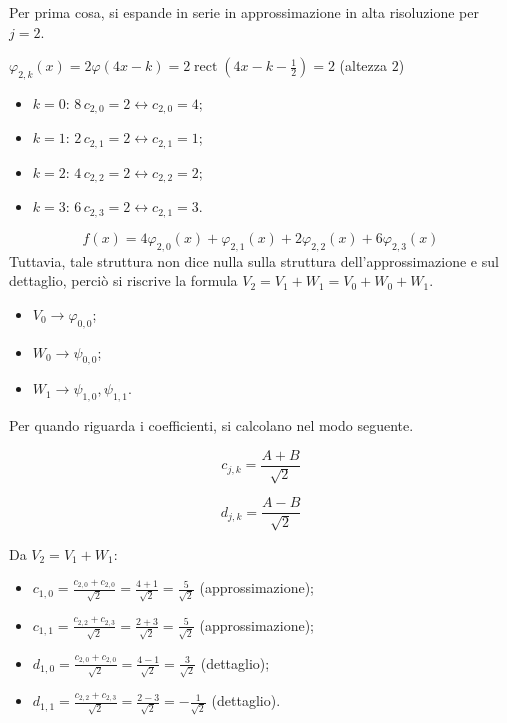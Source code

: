 Per prima cosa, si espande in serie in approssimazione in alta risoluzione per $j=2$.
\begin{center}
    $\varphi_{2,k}(x)=2\varphi\left(4x-k\right)=2\operatorname{rect}\left(4x-k-\frac{1}{2}\right)=2$ (altezza $2$)
\end{center}
\begin{itemize}
    \item $k=0$: $8 \,c_{2, 0}=2 \leftrightarrow c_{2, 0} = 4$;
    \item $k=1$: $2 \, c_{2, 1}=2 \leftrightarrow c_{2, 1} = 1$;
    \item $k=2$: $4 \,c_{2, 2}=2 \leftrightarrow c_{2, 2} = 2$;
    \item $k=3$: $6 \,c_{2, 3}=2 \leftrightarrow c_{2, 1} = 3$.
\end{itemize}
\begin{equation*}
    f(x)=4\varphi_{2,0}(x)+\varphi_{2,1}(x)+2\varphi_{2,2}(x)+6\varphi_{2,3}(x)
\end{equation*}
Tuttavia, tale struttura non dice nulla sulla struttura dell'approssimazione e sul dettaglio, perciò si riscrive la formula $V_2=V_1+W_1=V_0+W_0+W_1$.
\begin{itemize}
    \item $V_0 \rightarrow \varphi_{0,0}$;
    \item $W_0 \rightarrow \psi_{0,0}$;
    \item $W_1 \rightarrow \psi_{1,0}, \psi_{1,1}$.
\end{itemize}
Per quando riguarda i coefficienti, si calcolano nel modo seguente.
\begin{center}
\begin{minipage}{0.48\textwidth} %
    \centering
    \begin{equation*}
        c_{j, k} = \frac{A+B}{\sqrt{2}}
    \end{equation*}
\end{minipage}
\hfill %
\begin{minipage}{0.48\textwidth} %
    \centering
    \begin{equation*}
        d_{j, k} = \frac{A-B}{\sqrt{2}}
    \end{equation*}
\end{minipage}
\end{center}
Da $V_2=V_1+W_1$:
\begin{itemize}
    \item $c_{1, 0}=\frac{c_{2, 0} + c_{2, 0}}{\sqrt{2}}=\frac{4+1}{\sqrt{2}}=\frac{5}{\sqrt{2}}$ (approssimazione);
    \item $c_{1, 1}=\frac{c_{2, 2} + c_{2, 3}}{\sqrt{2}}=\frac{2+3}{\sqrt{2}}=\frac{5}{\sqrt{2}}$ (approssimazione);
    \item $d_{1, 0}=\frac{c_{2, 0} + c_{2, 0}}{\sqrt{2}}=\frac{4-1}{\sqrt{2}}=\frac{3}{\sqrt{2}}$ (dettaglio);
    \item $d_{1, 1}=\frac{c_{2, 2} + c_{2, 3}}{\sqrt{2}}=\frac{2-3}{\sqrt{2}}=-\frac{1}{\sqrt{2}}$ (dettaglio).
\end{itemize}
